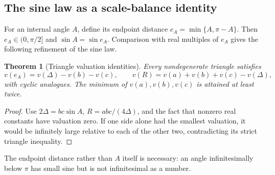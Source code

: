 \documentclass[11pt,letterpaper]{article}
\newtheorem{theorem}{Theorem}[section]
\theoremstyle{definition}
\theoremstyle{remark}
\numberwithin{equation}{section}
\begin{document}
\subsection{The sine law as a scale-balance identity}
For an internal angle $A$, define its endpoint distance $e_A=\min\{A,\pi-A\}$. Then $e_A\in(0,\pi/2]$ and $\sin A=\sin e_A$. Comparison with real multiples of $e_A$ gives the following refinement of the sine law.

\begin{theorem}[Triangle valuation identities]\label{thm:trianglescale}
Every nondegenerate triangle satisfies
\begin{equation}\label{eq:trianglescale}
 v(e_A)=v(\Delta)-v(b)-v(c),
 \qquad
 v(R)=v(a)+v(b)+v(c)-v(\Delta),
\end{equation}
with cyclic analogues. The minimum of $v(a),v(b),v(c)$ is attained at least twice.
\end{theorem}
\begin{proof}
Use $2\Delta=bc\sin A$, $R=abc/(4\Delta)$, and the fact that nonzero real constants have valuation zero. If one side alone had the smallest valuation, it would be infinitely large relative to each of the other two, contradicting its strict triangle inequality.
\end{proof}
The endpoint distance rather than $A$ itself is necessary: an angle infinitesimally below $\pi$ has small sine but is not infinitesimal as a number.
\end{document}
